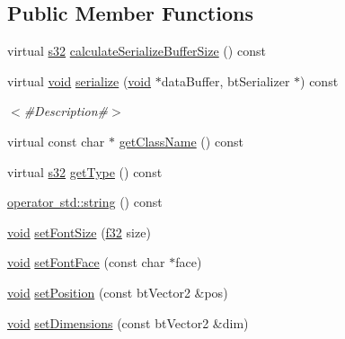 \subsection*{Public Member Functions}
\begin{DoxyCompactItemize}
\item 
virtual \mbox{\hyperlink{_util_8h_aa62c75d314a0d1f37f79c4b73b2292e2}{s32}} \mbox{\hyperlink{classnjli_1_1_button_h_u_d_a72a6b396ec221a2b33cc14217c936d0b}{calculate\+Serialize\+Buffer\+Size}} () const
\item 
virtual \mbox{\hyperlink{_thread_8h_af1e856da2e658414cb2456cb6f7ebc66}{void}} \mbox{\hyperlink{classnjli_1_1_button_h_u_d_a35bd5342f1ac5ea121d50f0a4c4b9981}{serialize}} (\mbox{\hyperlink{_thread_8h_af1e856da2e658414cb2456cb6f7ebc66}{void}} $\ast$data\+Buffer, bt\+Serializer $\ast$) const
\begin{DoxyCompactList}\small\item\em $<$\#\+Description\#$>$ \end{DoxyCompactList}\item 
virtual const char $\ast$ \mbox{\hyperlink{classnjli_1_1_button_h_u_d_aedbe9f0c1dea6d31dd13ff9e7e7e2b08}{get\+Class\+Name}} () const
\item 
virtual \mbox{\hyperlink{_util_8h_aa62c75d314a0d1f37f79c4b73b2292e2}{s32}} \mbox{\hyperlink{classnjli_1_1_button_h_u_d_add116dc958c02dbc33d7e686c4aff429}{get\+Type}} () const
\item 
\mbox{\hyperlink{classnjli_1_1_button_h_u_d_a7f1e4ffa23020919a96f41fad281d601}{operator std\+::string}} () const
\item 
\mbox{\hyperlink{_thread_8h_af1e856da2e658414cb2456cb6f7ebc66}{void}} \mbox{\hyperlink{classnjli_1_1_button_h_u_d_ab43182f8de5edb34d84d0284acb0e909}{set\+Font\+Size}} (\mbox{\hyperlink{_util_8h_a5f6906312a689f27d70e9d086649d3fd}{f32}} size)
\item 
\mbox{\hyperlink{_thread_8h_af1e856da2e658414cb2456cb6f7ebc66}{void}} \mbox{\hyperlink{classnjli_1_1_button_h_u_d_a3b92a6bd18407b356492489408317fbf}{set\+Font\+Face}} (const char $\ast$face)
\item 
\mbox{\hyperlink{_thread_8h_af1e856da2e658414cb2456cb6f7ebc66}{void}} \mbox{\hyperlink{classnjli_1_1_button_h_u_d_a3a5f2b5ddaab37fc50633902f8365927}{set\+Position}} (const bt\+Vector2 \&pos)
\item 
\mbox{\hyperlink{_thread_8h_af1e856da2e658414cb2456cb6f7ebc66}{void}} \mbox{\hyperlink{classnjli_1_1_button_h_u_d_a94ef2e932df76cb8b390420dce0ecfe2}{set\+Dimensions}} (const bt\+Vector2 \&dim)

\end{DoxyCompactItemize}
